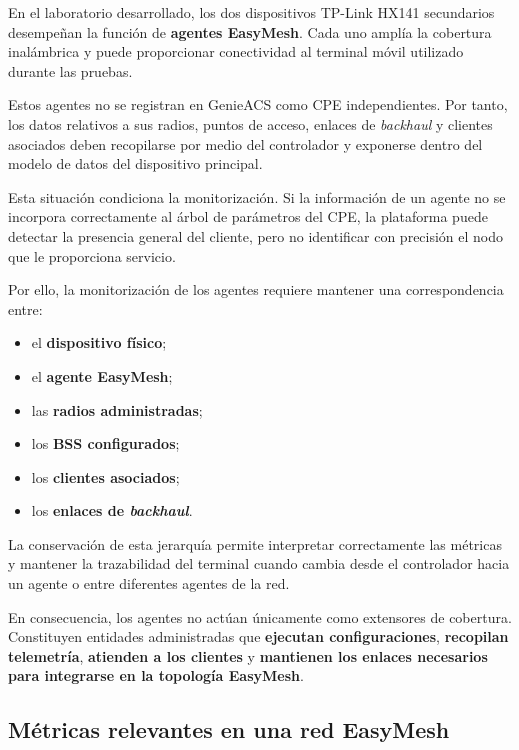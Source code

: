 En el laboratorio desarrollado, los dos dispositivos TP-Link HX141
secundarios desempeñan la función de
\textbf{agentes EasyMesh}. Cada uno amplía la cobertura inalámbrica y
puede proporcionar conectividad al terminal móvil utilizado durante las
pruebas.

Estos agentes no se registran en GenieACS como CPE independientes. Por
tanto, los datos relativos a sus radios, puntos de acceso, enlaces de
\textit{backhaul} y clientes asociados deben recopilarse por medio del
controlador y exponerse dentro del modelo de datos del dispositivo
principal.

Esta situación condiciona la monitorización. Si la información de un
agente no se incorpora correctamente al árbol de parámetros del CPE, la
plataforma puede detectar la presencia general del cliente, pero no
identificar con precisión el nodo que le proporciona servicio.

Por ello, la monitorización de los agentes requiere mantener una
correspondencia entre:

\begin{itemize}
    \item el \textbf{dispositivo físico};
    \item el \textbf{agente EasyMesh};
    \item las \textbf{radios administradas};
    \item los \textbf{BSS configurados};
    \item los \textbf{clientes asociados};
    \item los \textbf{enlaces de \textit{backhaul}}.
\end{itemize}

La conservación de esta jerarquía permite interpretar correctamente las
métricas y mantener la trazabilidad del terminal cuando cambia desde el
controlador hacia un agente o entre diferentes agentes de la red.

En consecuencia, los agentes no actúan únicamente como extensores de
cobertura. Constituyen entidades administradas que
\textbf{ejecutan configuraciones}, \textbf{recopilan telemetría},
\textbf{atienden a los clientes} y
\textbf{mantienen los enlaces necesarios para integrarse en la
topología EasyMesh}.

\subsection{Métricas relevantes en una red EasyMesh}
\label{subsec:metricas-relevantes-red-easymesh}

